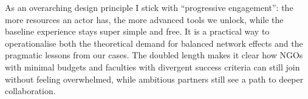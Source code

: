 As an overarching design principle I stick with ``progressive engagement'': the more resources an actor has, the more advanced tools we unlock, while the baseline experience stays super simple and free. It is a practical way to operationalise both the theoretical demand for balanced network effects and the pragmatic lessons from our cases. The doubled length makes it clear how NGOs with minimal budgets and faculties with divergent success criteria can still join without feeling overwhelmed, while ambitious partners still see a path to deeper collaboration.
